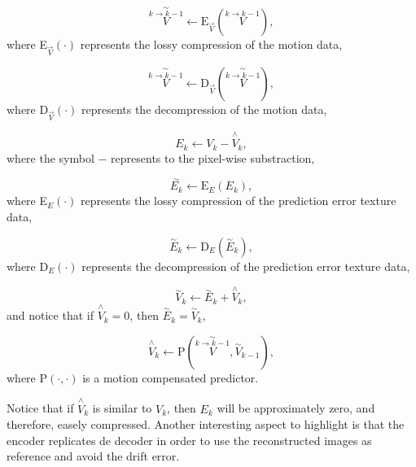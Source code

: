 \begin{equation}
  \overset{\sim}{\overset{k\rightarrow k-1}{V}} \leftarrow \text{E}_{\overset{\rightarrow}{V}}(\overset{k\rightarrow k-1}{V}),
  \tag{d}
\end{equation}
where E$_{\overset{\rightarrow}{V}}(\cdot)$ represents the lossy
  compression of the motion data,

\begin{equation}
  \overset{\sim}{\overset{k\rightarrow k-1}{V}} \leftarrow \text{D}_{\overset{\rightarrow}{V}}(\overset{\sim}{\overset{k\rightarrow k-1}{V}}),
  \tag{e}
\end{equation}
where D$_{\overset{\rightarrow}{V}}(\cdot)$ represents the 
decompression of the motion data,

\begin{equation}
  E_k \leftarrow V_k - \overset{\wedge}{{V}}_k,
  \tag{f}
\end{equation}
where the symbol $-$ represents to the pixel-wise substraction,

\begin{equation}
  \overset{\sim}{E_k} \leftarrow \text{E}_{E}(E_k),
  \tag{g}
\end{equation}
where E$_{E}(\cdot)$ represents the lossy compression of the
prediction error texture data,

\begin{equation}
  \overset{\sim}{E}_k \leftarrow \text{D}_{E}(\overset{\sim}{E}_k),
  \tag{h}
\end{equation}
where D$_{E}(\cdot)$ represents the decompression of the prediction
error texture data,

\begin{equation}
  \overset{\sim}{V}_k \leftarrow \overset{\sim}{E}_k + \overset{\wedge}{V}_k,
  \tag{i}
\end{equation}
and notice that if $\overset{\wedge}{V}_k=0$, then
$\overset{\sim}{E}_k = \overset{\sim}{V}_k$,

\begin{equation}
  \overset{\wedge}{V}_k \leftarrow \text{P}(\overset{\sim}{\overset{k\rightarrow k-1}{V}}, \overset{\sim}{V}_{k-1}),
  \tag{j}
\end{equation}
where P$(\cdot,\cdot)$ is a motion compensated predictor.

Notice that if $\overset{\wedge}{{V}}_k$ is similar to $V_k$, then
$E_k$ will be approximately zero, and therefore, easely
compressed. Another interesting aspect to highlight is that the
encoder replicates de decoder in order to use the reconstructed images
as reference and avoid the drift error.

